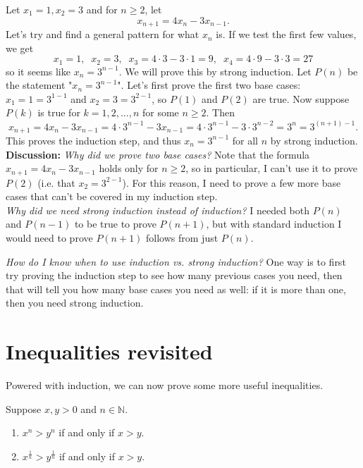 \documentclass[11pt,dvipsnames]{book}
\numberwithin{figure}{section} %
\numberwithin{table}{section} %
\begin{document}
\begin{example}
Let $x_{1}=1, x_{2} =3$ and for $n\geq 2$, let
\[
x_{n+1} = 4x_{n}-3x_{n-1}.
\]
Let's try and find a general pattern for what $x_{n}$ is. If we test the first few values, we get
\[
x_{1} = 1, \;\; x_{2} = 3 , \;\; x_{3} = 4\cdot 3-3\cdot 1 = 9, \;\; x_{4} = 4\cdot 9 - 3\cdot 3 = 27
\]
so it seems like $x_{n} = 3^{n-1}$. We will prove this by strong induction. Let $P(n)$ be the statement "$x_{n} = 3^{n-1}$". Let's first prove the first two base cases: $x_{1}=1=3^{1-1}$ and $x_{2}=3=3^{2-1}$, so $P(1)$ and $P(2)$ are true. Now  suppose $P(k)$ is true for $k=1,2,...,n$ for some $n\geq 2$. Then
\[
x_{n+1} =4x_{n}-3x_{n-1} = 4\cdot 3^{n-1} -3x_{n-1} = 4\cdot 3^{n-1} - 3\cdot 3^{n-2} = 3^{n} = 3^{(n+1)-1}.
\]
This proves the induction step, and thus $x_n=3^{n-1}$ for all $n$ by strong induction.\\

{\bf Discussion:} {\it Why did we prove two base cases?} Note that the formula $x_{n+1} =4x_{n}-3x_{n-1} $ holds only for $n\geq 2$, so in particular, I can't use it to prove $P(2)$ (i.e. that $x_{2}=3^{2-1}$). For this reason, I need to prove a few more base cases that can't be covered in my induction step. \\

{\it Why did we need strong induction instead of induction?}  I needed both $P(n)$ and $P(n-1)$ to be true to prove $P(n+1)$, but with standard induction I would need to prove $P(n+1)$ follows from just $P(n)$.\\
\end{example}

\begin{protip}
{\it How do I know when to use induction vs. strong induction?} One way is to first try proving the induction step to see how many previous cases you need, then that will tell you how many base cases you need as well: if it is more than one, then you need strong induction.
\end{protip}

\section{Inequalities revisited}

Powered with induction, we can now prove some more useful inequalities.

\begin{proposition}
Suppose $x,y>0$ and $n\in\mathbb{N}$.
\begin{enumerate}[label=(\alph*)]
\item $x^n>y^n$ if and only if $x>y$.
\item $x^{\frac{1}{n}}>y^{\frac{1}{n}}$ if and only if $x>y$.
\end{enumerate}
\end{proposition}
\end{document}

